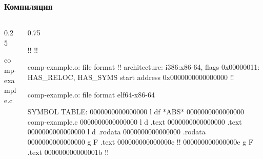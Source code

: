 \documentclass[compress, 8pt, aspectratio=169]{beamer}
\begin{document}

\begin{frame}[fragile]

    \frametitle{Компиляция}

    \begin{columns}[T]

        \begin{column}{0.25\textwidth}

                {comp-example.c}

        \end{column}

        \begin{column}{0.75\textwidth}

            \begin{terminalwindow}
!!
!!

comp-example.o:     file format !!
architecture: i386:x86-64, flags 0x00000011:
HAS_RELOC, HAS_SYMS
start address 0x0000000000000000
!!

comp-example.o:     file format elf64-x86-64

SYMBOL TABLE:
0000000000000000 l    df *ABS*  0000000000000000 comp-example.c
0000000000000000 l    d  .text  0000000000000000 .text
0000000000000000 l    d  .rodata        0000000000000000 .rodata
0000000000000000 g     F .text  000000000000000e !!
000000000000000e g     F .text  000000000000001b  !!
            \end{terminalwindow}

        \end{column}

    \end{columns}

\end{frame}
\end{document}
